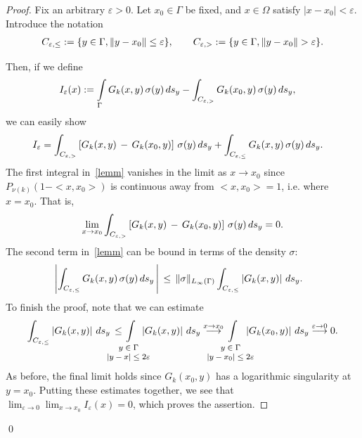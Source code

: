 \begin{proof}
Fix an arbitrary $\varepsilon > 0$. Let $x_0 \in \Gamma$ be fixed, and
$x \in \Omega$ satisfy $|x-x_0| < \varepsilon$.  Introduce the notation 
\begin{align*}
  C_{\e,\leq}:=\{y \in \Gamma,\|y-x_0\|\leq\e\},\qquad  
  C_{\e,>}:=\{y\in \Gamma,\|y-x_0\|>\e\}.
\end{align*}

Then, if we define
\begin{align*}
  I_{\varepsilon}(x) &: = \int\limits_\Gamma G_k(x,y)
  \,\sigma(y) \,ds_{y} - \int_{C_{\varepsilon,>}} G_k(x_0,y)
  \,\sigma(y)\,ds_{y},
\end{align*} 
we can easily show
\begin{align}
  I_{\varepsilon}& =  \int_{C_{\varepsilon,>}}
  \left[ G_k(x,y)\,-\, G_k(x_0,y) \right]\,\sigma(y)\,ds_{y} +    
    \int_{C_{\varepsilon,\leq}} G_k(x,y)\, \sigma(y)\, ds_{y}.
  \label{lemm}
\end{align}
The first integral in~\eqref{lemm} vanishes in the limit as
$x\rightarrow x_0$ since $P_{\nu(k)}(1-<x,x_0>)$ is continuous away from
$<x,x_0>=1$, i.e. where $x=x_0$.  That is, 
\begin{align*}
  \lim\limits_{x \to x_0} \int_{C_{\varepsilon,>}}
  \left[G_k(x,y)\,-\,G_k(x_0,y) \right]\,\sigma(y)\,ds_{y} = 0 .
\end{align*}
The second term in~\eqref{lemm} can be bound in terms of the density
$\sigma$:
\begin{align*}
  &\left|\int_{C_{\varepsilon,\leq}}
  G_k(x,y)\,\sigma(y)\,ds_{y}\,\right| \, \leq \,
  \| \sigma \|_{L_\infty(\Gamma)} \int_{C_{\varepsilon,\leq}}
  \left| G_k(x,y)\right|\,ds_{y}.
\end{align*}
To finish the proof, note that we can estimate
\begin{align*}
  \int_{C_{\e,\leq}} \left| G_k(x,y)\right|\,ds_{y}\,\leq\,
  \hspace*{-8mm} \int\limits_{\footnotesize
  \begin{array}{c}y \in \Gamma \\ |y-x| \leq 2\varepsilon\end{array}} 
  \hspace*{-6mm} \left| G_k(x,y)\right|\,ds_{y}
  \buildrel {x\rightarrow x_{0}}\over\longrightarrow 
  \hspace*{-8mm} \int\limits_{\footnotesize
  \begin{array}{c}y \in \Gamma \\ |y-x_0| \leq 2\varepsilon\end{array}} 
  \hspace*{-6mm} \left| G_k(x_0,y)\right|\,ds_{y}
  \buildrel{\varepsilon\rightarrow 0}\over\longrightarrow 0.
\end{align*}
As before, the final limit holds since $G_{k}(x_{0},y)$ has a
logarithmic singularity at $y = x_{0}$.  Putting these estimates
together, we see that  $\displaystyle \lim_{\varepsilon\rightarrow
0}\lim_{x\rightarrow x_{0}} I_{\varepsilon}(x)=0$, which proves the
assertion.
\end{proof}
\qed


